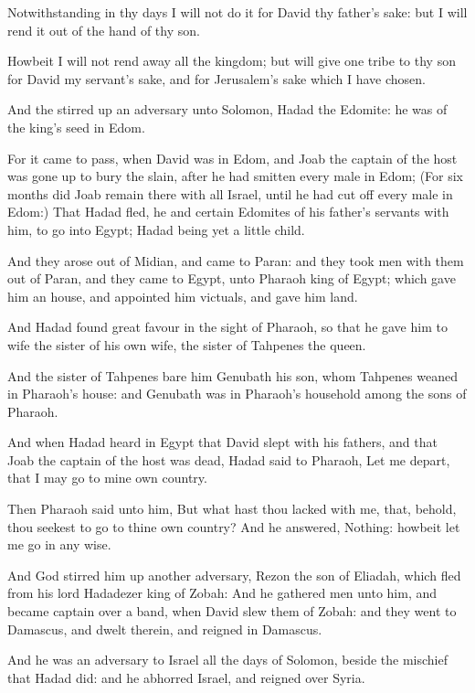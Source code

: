 \Verse Notwithstanding in thy days I will not do it for David thy father's sake: but I will rend it out of the hand of thy son.

\Verse Howbeit I will not rend away all the kingdom; but will give one tribe to thy son for David my servant's sake, and for Jerusalem's sake which I have chosen.

\Verse And the \LORD stirred up an adversary unto Solomon, Hadad the Edomite: he was of the king's seed in Edom.

\Verse For it came to pass, when David was in Edom, and Joab the captain of the host was gone up to bury the slain, after he had smitten every male in Edom; \Verse (For six months did Joab remain there with all Israel, until he had cut off every male in Edom:) \Verse That Hadad fled, he and certain Edomites of his father's servants with him, to go into Egypt; Hadad being yet a little child.

\Verse And they arose out of Midian, and came to Paran: and they took men with them out of Paran, and they came to Egypt, unto Pharaoh king of Egypt; which gave him an house, and appointed him victuals, and gave him land.

\Verse And Hadad found great favour in the sight of Pharaoh, so that he gave him to wife the sister of his own wife, the sister of Tahpenes the queen.

\Verse And the sister of Tahpenes bare him Genubath his son, whom Tahpenes weaned in Pharaoh's house: and Genubath was in Pharaoh's household among the sons of Pharaoh.

\Verse And when Hadad heard in Egypt that David slept with his fathers, and that Joab the captain of the host was dead, Hadad said to Pharaoh, Let me depart, that I may go to mine own country.

\Verse Then Pharaoh said unto him, But what hast thou lacked with me, that, behold, thou seekest to go to thine own country? And he answered, Nothing: howbeit let me go in any wise.

\Verse And God stirred him up another adversary, Rezon the son of Eliadah, which fled from his lord Hadadezer king of Zobah: \Verse And he gathered men unto him, and became captain over a band, when David slew them of Zobah: and they went to Damascus, and dwelt therein, and reigned in Damascus.

\Verse And he was an adversary to Israel all the days of Solomon, beside the mischief that Hadad did: and he abhorred Israel, and reigned over Syria.

